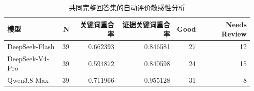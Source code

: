 \begin{table}[htbp]
\centering\footnotesize
\setlength{\tabcolsep}{4pt}
\caption{共同完整回答集的自动评价敏感性分析}
\label{tab:cm-auto-common}
\begin{tabular}{lrrrrr}
\toprule
模型 & N & 关键词重合率 & 证据关键词重合率 & Good & Needs Review \\
\midrule
DeepSeek-Flash & 39 & 0.662393 & 0.846581 & 27 & 12 \\
DeepSeek-V4-Pro & 39 & 0.594872 & 0.840598 & 24 & 15 \\
Qwen3.8-Max & 39 & 0.711966 & 0.955128 & 31 & 8 \\
\bottomrule
\end{tabular}

\end{table}
